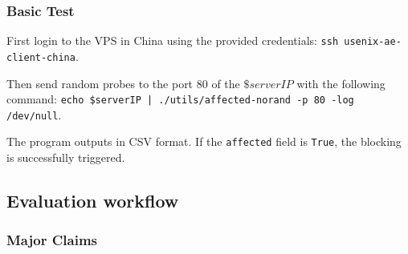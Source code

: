 \subsubsection{Basic Test}

First login to the VPS in China using the provided credentials:
\texttt{ssh usenix-ae-client-china}.

Then send random probes to the port $80$ of the $\$serverIP$ with the following command:
\texttt{echo \$serverIP | ./utils/affected-norand -p 80 -log /dev/null}.

The program outputs in CSV format. 
If the \texttt{affected} field is \texttt{True},
the blocking is successfully triggered.


\subsection{Evaluation workflow}

\subsubsection{Major Claims}

